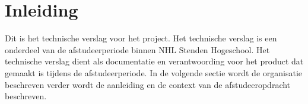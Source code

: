 \chapter{Inleiding}
Dit is het technische verslag voor het  project.
Het technische verslag is een onderdeel van de afstudeerperiode binnen NHL Stenden Hogeschool.
Het technische verslag dient als documentatie en verantwoording voor het product dat gemaakt is tijdens de afstudeerperiode.
In de volgende sectie wordt de organisatie beschreven verder wordt de aanleiding en de context van de afstudeeropdracht beschreven.


 

\newpage


